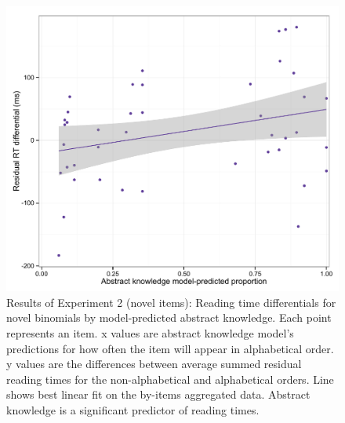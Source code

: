 \documentclass[authoryear]{elsarticle}
\begin{document}
\begin{figure}[t]
\includegraphics[scale=0.87]{spr-results.pdf}
\caption{Results of Experiment 2 (novel items): Reading time differentials for novel binomials by model-predicted abstract knowledge. Each point represents an item. x values are abstract knowledge model's predictions for how often the item will appear in alphabetical order. y values are the differences between average summed residual reading times for the non-alphabetical and alphabetical orders. Line shows best linear fit on the by-items aggregated data. Abstract knowledge is a significant predictor of reading times.} \label{fig:spr-model}
\end{figure}
\end{document}
